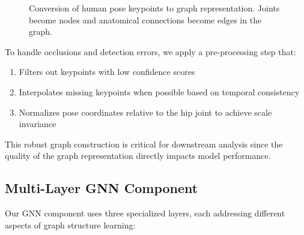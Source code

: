 \documentclass[conference]{IEEEtran}
\begin{document}
\begin{figure*}[htbp]
    \caption{Conversion of human pose keypoints to graph representation. Joints become nodes and anatomical connections become edges in the graph.}
    \label{fig:pose_graph}
\end{figure*}

To handle occlusions and detection errors, we apply a pre-processing step that:
\begin{enumerate}
    \item Filters out keypoints with low confidence scores
    \item Interpolates missing keypoints when possible based on temporal consistency
    \item Normalizes pose coordinates relative to the hip joint to achieve scale
          invariance
\end{enumerate}

This robust graph construction is critical for downstream analysis since the
quality of the graph representation directly impacts model performance.

\subsection{Multi-Layer GNN Component}
Our GNN component uses three specialized layers, each addressing different
aspects of graph structure learning:
\end{document}
